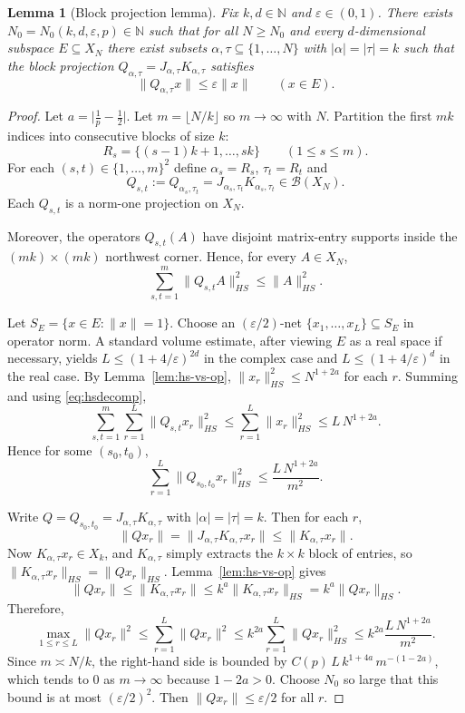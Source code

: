 \documentclass[11pt]{amsart}
\theoremstyle{plain}
\newtheorem{lemma}[theorem]{Lemma}
\theoremstyle{definition}
\numberwithin{equation}{section}
\newcommand{\norm}[1]{\lVert #1 \rVert}
\newcommand{\Bop}{\mathcal{B}}
\newcommand{\N}{\mathbb{N}}
\renewcommand{\le}{\leqslant}
\renewcommand{\ge}{\geqslant}
\begin{document}
\begin{lemma}[Block projection lemma]\label{lem:blockkill}
Fix $k,d\in\N$ and $\varepsilon\in(0,1)$.
There exists $N_0=N_0(k,d,\varepsilon,p)\in\N$ such that for all $N\ge N_0$ and every $d$-dimensional subspace $E\subseteq X_N$
there exist subsets $\alpha,\tau\subseteq\{1,\dots,N\}$ with $|\alpha|=|\tau|=k$
such that the block projection $Q_{\alpha,\tau}=J_{\alpha,\tau}K_{\alpha,\tau}$ satisfies
\[
\norm{Q_{\alpha,\tau} x}\le \varepsilon \norm{x}\qquad(x\in E).
\]
\end{lemma}

\begin{proof}
Let $a=\big|\frac1p-\frac12\big|$.
Let $m=\lfloor N/k\rfloor$ so $m\to\infty$ with $N$.
Partition the first $mk$ indices into consecutive blocks of size $k$:
\[
R_s=\{(s-1)k+1,\dots,sk\}\qquad (1\le s\le m).
\]
For each $(s,t)\in\{1,\dots,m\}^2$ define $\alpha_s=R_s$, $\tau_t=R_t$ and
\[
Q_{s,t}:=Q_{\alpha_s,\tau_t}=J_{\alpha_s,\tau_t}K_{\alpha_s,\tau_t}\in\Bop(X_N).
\]
Each $Q_{s,t}$ is a norm-one projection on $X_N$.

Moreover, the operators $Q_{s,t}(A)$ have disjoint matrix-entry supports inside the $(mk)\times(mk)$ northwest corner.
Hence, for every $A\in X_N$,
\begin{equation}\label{eq:hsdecomp}
\sum_{s,t=1}^m \norm{Q_{s,t}A}_{HS}^2 \le \norm{A}_{HS}^2.
\end{equation}

Let $S_E=\{x\in E:\norm{x}=1\}$. Choose an $(\varepsilon/2)$-net $\{x_1,\dots,x_L\}\subseteq S_E$ in operator norm.
A standard volume estimate, after viewing $E$ as a real space if necessary, yields
$L\le (1+4/\varepsilon)^{2d}$ in the complex case and $L\le (1+4/\varepsilon)^d$ in the real case.
By Lemma~\ref{lem:hs-vs-op}, $\norm{x_r}_{HS}^2\le N^{1+2a}$ for each $r$.
Summing and using \eqref{eq:hsdecomp},
\[
\sum_{s,t=1}^m \sum_{r=1}^L \norm{Q_{s,t}x_r}_{HS}^2
\le \sum_{r=1}^L \norm{x_r}_{HS}^2
\le L\,N^{1+2a}.
\]
Hence for some $(s_0,t_0)$,
\[
\sum_{r=1}^L \norm{Q_{s_0,t_0}x_r}_{HS}^2 \le \frac{L\,N^{1+2a}}{m^2}.
\]

Write $Q=Q_{s_0,t_0}=J_{\alpha,\tau}K_{\alpha,\tau}$ with $|\alpha|=|\tau|=k$.
Then for each $r$,
\[
\norm{Qx_r}=\norm{J_{\alpha,\tau}K_{\alpha,\tau}x_r}\le \norm{K_{\alpha,\tau}x_r}.
\]
Now $K_{\alpha,\tau}x_r\in X_k$, and $K_{\alpha,\tau}$ simply extracts the $k\times k$ block of entries,
so $\norm{K_{\alpha,\tau}x_r}_{HS}=\norm{Qx_r}_{HS}$. Lemma~\ref{lem:hs-vs-op} gives
\[
\norm{Qx_r}\le \norm{K_{\alpha,\tau}x_r}\le k^{a}\norm{K_{\alpha,\tau}x_r}_{HS}=k^{a}\norm{Qx_r}_{HS}.
\]
Therefore,
\[
\max_{1\le r\le L}\norm{Qx_r}^2
\le \sum_{r=1}^L \norm{Qx_r}^2
\le k^{2a}\sum_{r=1}^L \norm{Qx_r}_{HS}^2
\le k^{2a}\frac{L\,N^{1+2a}}{m^2}.
\]
Since $m\asymp N/k$, the right-hand side is bounded by $C(p)\,L\,k^{1+4a}\,m^{-(1-2a)}$, which tends to $0$ as $m\to\infty$
because $1-2a>0$. Choose $N_0$ so large that this bound is at most $(\varepsilon/2)^2$.
Then $\norm{Qx_r}\le \varepsilon/2$ for all $r$.


\end{proof}
\end{document}
